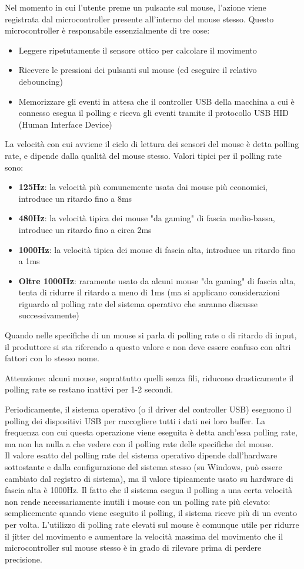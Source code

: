 Nel momento in cui l'utente preme un pulsante sul mouse, l'azione viene registrata dal microcontroller presente all'interno del mouse stesso. Questo microcontroller è responsabile essenzialmente di tre cose:\begin{itemize}
	\item Leggere ripetutamente il sensore ottico per calcolare il movimento
	\item Ricevere le pressioni dei pulsanti sul mouse (ed eseguire il relativo debouncing)
	\item Memorizzare gli eventi in attesa che il controller USB della macchina a cui è connesso esegua il polling e riceva gli eventi tramite il protocollo USB HID (Human Interface Device)
\end{itemize}
La velocità con cui avviene il ciclo di lettura dei sensori del mouse è detta polling rate, e dipende dalla qualità del mouse stesso. Valori tipici per il polling rate sono:
\begin{itemize}
	\item \textbf{125Hz}: la velocità più comunemente usata dai mouse più economici, introduce un ritardo fino a 8ms
	\item \textbf{480Hz}: la velocità tipica dei mouse "da gaming" di fascia medio-bassa, introduce un ritardo fino a circa 2ms
	\item \textbf{1000Hz}: la velocità tipica dei mouse di fascia alta, introduce un ritardo fino a 1ms
	\item \textbf{Oltre 1000Hz}: raramente usato da alcuni mouse "da gaming" di fascia alta, tenta di ridurre il ritardo a meno di 1ms (ma si applicano considerazioni riguardo al polling rate del sistema operativo che saranno discusse successivamente)
\end{itemize}
Quando nelle specifiche di un mouse si parla di polling rate o di ritardo di input, il produttore si sta riferendo a questo valore e non deve essere confuso con altri fattori con lo stesso nome.

Attenzione: alcuni mouse, soprattutto quelli senza fili, riducono drasticamente il polling rate se restano inattivi per 1-2 secondi.

Periodicamente, il sistema operativo (o il driver del controller USB) eseguono il polling dei dispositivi USB per raccogliere tutti i dati nei loro buffer. La frequenza con cui questa operazione viene eseguita è detta anch'essa polling rate, ma non ha nulla a che vedere con il polling rate delle specifiche del mouse.\\
Il valore esatto del polling rate del sistema operativo dipende dall'hardware sottostante e dalla configurazione del sistema stesso (su Windows, può essere cambiato dal registro di sistema), ma il valore tipicamente usato su hardware di fascia alta è 1000Hz. Il fatto che il sistema esegua il polling a una certa velocità non rende necessariamente inutili i mouse con un polling rate più elevato: semplicemente quando viene eseguito il polling, il sistema riceve più di un evento per volta. L'utilizzo di polling rate elevati sul mouse è comunque utile per ridurre il jitter del movimento e aumentare la velocità massima del movimento che il microcontroller sul mouse stesso è in grado di rilevare prima di perdere precisione.

